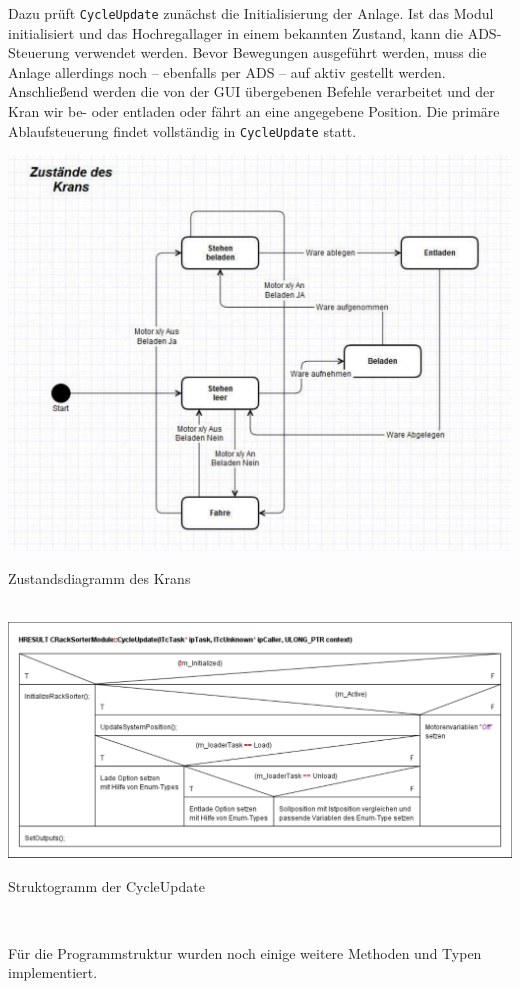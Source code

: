 \documentclass{fh-ium-bama}
\begin{document}
Dazu prüft \lstinline|CycleUpdate| zunächst die Initialisierung der Anlage. Ist das Modul initialisiert und das Hochregallager in einem bekannten Zustand, kann die ADS-Steuerung verwendet werden. Bevor Bewegungen ausgeführt werden, muss die Anlage allerdings noch – ebenfalls per ADS – auf aktiv gestellt werden. Anschließend werden die von der GUI übergebenen Befehle verarbeitet und der Kran wir be- oder entladen oder fährt an eine angegebene Position. Die primäre Ablaufsteuerung findet vollständig in \lstinline|CycleUpdate| statt.
\begin{center}
\includegraphics[scale=0.53]{Zustand.pdf}\\
\begin{small}Zustandsdiagramm des Krans\end{small}\\
\includegraphics[scale=0.45]{HRESULT_CRackSorterModule.pdf}\\
\begin{small}Struktogramm der CycleUpdate\end{small}\\[2pt]
\end{center}
Für die Programmstruktur wurden noch einige weitere Methoden und Typen implementiert.
\end{document}
